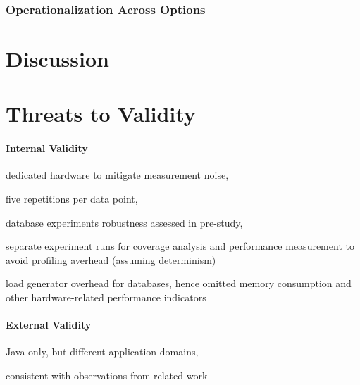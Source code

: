 \subsubsection{Operationalization Across Options}


\section{Discussion}

\section{Threats to Validity}\label{sec:threats}
\paragraph{Internal Validity}\label{sec:internal_validity}

\begin{compactitem}
	\item dedicated hardware to mitigate measurement noise, 
	\item five repetitions per data point, 
	\item database experiments robustness assessed in pre-study,
	\item separate experiment runs for coverage analysis and performance measurement to avoid profiling averhead (assuming determinism)
	\item load generator overhead for databases, hence omitted memory consumption and other hardware-related performance indicators 
\end{compactitem}

\paragraph{External Validity}\label{sec:external_validity}
\begin{compactitem}
	\item Java only, but different application domains,
	\item consistent with observations from related work
\end{compactitem}

